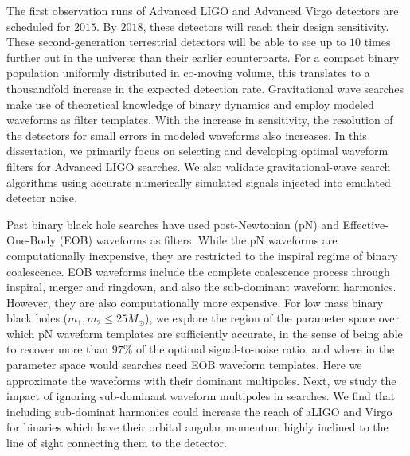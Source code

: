 

The first observation runs of Advanced LIGO and Advanced Virgo detectors 
are scheduled for $2015$. By $2018$, these detectors will reach 
their design sensitivity. These second-generation terrestrial detectors
will be able to see up to $10$ times further out in the universe 
than their earlier counterparts. For a compact binary population
uniformly distributed in co-moving volume, this translates to 
a thousandfold increase in the expected detection rate.
% 
Gravitational wave searches make use of theoretical knowledge of
binary dynamics and employ modeled waveforms as filter templates.
With the increase in sensitivity, the resolution of the detectors 
for small errors in modeled waveforms also increases. In this dissertation,
we primarily focus on selecting and developing optimal waveform filters
for Advanced LIGO searches. We also validate gravitational-wave 
search algorithms using accurate numerically simulated signals injected 
into emulated detector noise.

Past binary black hole searches have used post-Newtonian (pN) and 
Effective-One-Body (EOB) waveforms as filters. While the pN waveforms are 
computationally inexpensive, they are restricted to the inspiral
regime of binary coalescence. EOB waveforms include the complete
coalescence process through inspiral, merger and ringdown, and also
the sub-dominant waveform harmonics. However, they are also 
computationally more expensive. For low mass binary black holes 
($m_1,m_2\leq 25M_\odot$),
we explore the region of the parameter space over which pN waveform
templates are sufficiently accurate, in the sense of being able to 
recover more than $97\%$ of the optimal signal-to-noise ratio, 
and where in the parameter space would searches need EOB
waveform templates.
% 
Here we approximate the waveforms with their dominant multipoles. Next,
we study the impact of ignoring sub-dominant waveform multipoles in 
searches. We find that including sub-dominat harmonics could increase
the reach of aLIGO and Virgo for binaries which have their orbital
angular momentum highly inclined to the line of sight connecting them
to the detector.

